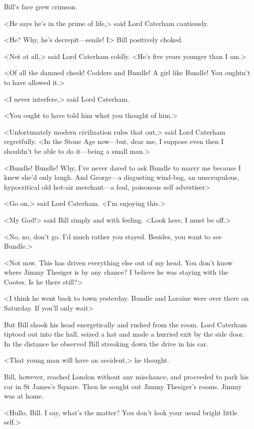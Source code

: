 Bill's face grew crimson.

<He says he's in the prime of life,> said Lord Caterham cautiously.

<He? Why, he's decrepit—senile! I\longdash> Bill positively choked.

<Not at all,> said Lord Caterham coldly. <He's five years younger than I am.>

<Of all the damned cheek! Codders and Bundle! A girl like Bundle! You oughtn't to have allowed it.>

<I never interfere,> said Lord Caterham.

<You ought to have told him what you thought of him.>

<Unfortunately modern civilization rules that out,> said Lord Caterham regretfully. <In the Stone Age now—but, dear me, I suppose even then I shouldn't be able to do it—being a small man.>

<Bundle! Bundle! Why, I've never dared to ask Bundle to marry me because I knew she'd only laugh. And George—a disgusting wind-bag, an unscrupulous, hypocritical old hot-air merchant—a foul, poisonous self advertiser\longdash>

<Go on,> said Lord Caterham. <I'm enjoying this.>

<My God!> said Bill simply and with feeling. <Look here, I must be off.>

<No, no, don't go. I'd much rather you stayed. Besides, you want to see Bundle.>

<Not now. This has driven everything else out of my head. You don't know where Jimmy Thesiger is by any chance? I believe he was staying with the Cootes. Is he there still?>

<I think he went back to town yesterday. Bundle and Loraine were over there on Saturday. If you'll only wait\longdash>

But Bill shook his head energetically and rushed from the room. Lord Caterham tiptoed out into the hall, seized a hat and made a hurried exit by the side door. In the distance he observed Bill streaking down the drive in his car.

<That young man will have an accident,> he thought.

Bill, however, reached London without any mischance, and proceeded to park his car in St James's Square. Then he sought out Jimmy Thesiger's rooms. Jimmy was at home.

<Hullo, Bill. I say, what's the matter? You don't look your usual bright little self.>

